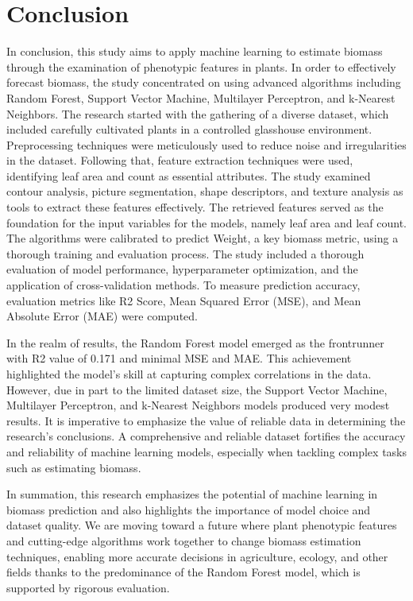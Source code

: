 \documentclass[a4paper,12pt]{report}%
\renewcommand{\\}{\vspace*{0.5\baselineskip} \newline}
\begin{document}
\chapter{Conclusion}
In conclusion, this study aims to apply machine learning to estimate biomass through the examination of phenotypic features in plants. In order to effectively forecast biomass, the study concentrated on using advanced algorithms including Random Forest, Support Vector Machine, Multilayer Perceptron, and k-Nearest Neighbors. The research started with the gathering of a diverse dataset, which included carefully cultivated plants in a controlled glasshouse environment.
Preprocessing techniques were meticulously used to reduce noise and irregularities in the dataset. Following that, feature extraction techniques were used, identifying leaf area and count as essential attributes. The study examined contour analysis, picture segmentation, shape descriptors, and texture analysis as tools to extract these features effectively.
The retrieved features served as the foundation for the input variables for the models, namely leaf area and leaf count. The algorithms were calibrated to predict Weight, a key biomass metric, using a thorough training and evaluation process. The study included a thorough evaluation of model performance, hyperparameter optimization, and the application of cross-validation methods. To measure prediction accuracy, evaluation metrics like R2 Score, Mean Squared Error (MSE), and Mean Absolute Error (MAE) were computed.

\noindent In the realm of results, the Random Forest model emerged as the frontrunner with R2 value of 0.171 and minimal MSE and MAE. This achievement highlighted the model's skill at capturing complex correlations in the data. However, due in part to the limited dataset size, the Support Vector Machine, Multilayer Perceptron, and k-Nearest Neighbors models produced very modest results.
It is imperative to emphasize the value of reliable data in determining the research's conclusions. A comprehensive and reliable dataset fortifies the accuracy and reliability of machine learning models, especially when tackling complex tasks such as estimating biomass.

\noindent In summation, this research emphasizes the potential of machine learning in biomass prediction and also highlights the importance of model choice and dataset quality. We are moving toward a future where plant phenotypic features and cutting-edge algorithms work together to change biomass estimation techniques, enabling more accurate decisions in agriculture, ecology, and other fields thanks to the predominance of the Random Forest model, which is supported by rigorous evaluation.
\end{document}
